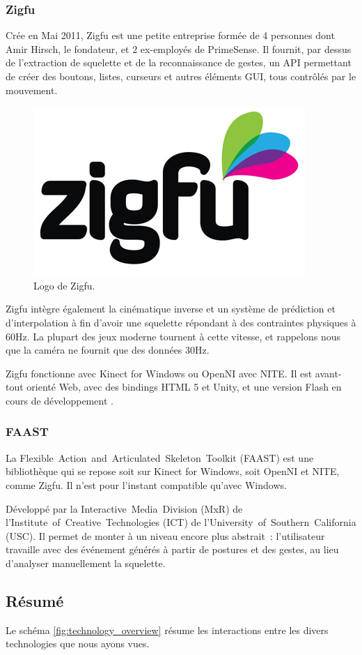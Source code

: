 \subsubsection{Zigfu}
Crée en Mai 2011, Zigfu est une petite entreprise formée de 4 personnes dont 
Amir Hirsch, le fondateur, et 2 ex-employés de PrimeSense. Il fournit, 
par dessus de l'extraction de squelette et de la reconnaissance
de gestes, un API permettant de créer des boutons, listes, curseurs et autres
éléments GUI, tous contrôlés par le mouvement.
\begin{figure}[h!]
\centering
\includegraphics[width=0.3\linewidth]{images/zigfu_logo}
\caption{Logo de Zigfu.}
\end{figure}
Zigfu intègre également la cinématique inverse et un système de 
prédiction et
d'interpolation à fin d'avoir une squelette répondant à des contraintes 
physiques à 60Hz\cite{zigfu_video}. La plupart des jeux moderne tournent à cette 
vitesse, et 
rappelons nous que la caméra ne fournit que des données 30Hz.

Zigfu fonctionne avec Kinect for Windows ou OpenNI avec NITE. Il est 
avant-tout orienté Web, avec des
bindings HTML 5 et Unity, et une version Flash en cours de développement
\cite{zigfu_review}.

\subsubsection{FAAST}
La Flexible~Action~and~Articulated~Skeleton~Toolkit (FAAST) est une 
bibliothèque qui se repose soit sur Kinect for Windows, soit OpenNI et NITE, 
comme Zigfu. Il n'est pour l'instant compatible qu'avec Windows.

Développé par la Interactive~Media~Division (MxR) de 
l'Institute~of~Creative~Technologies (ICT) de 
l'University~of~Southern~California (USC). Il permet de monter à un niveau 
encore plus abstrait~: l'utilisateur travaille avec des événement générés à
partir de postures et des gestes, au lieu d'analyser manuellement la 
squelette.


\subsection{Résumé}
Le schéma \ref{fig:technology_overview} résume les interactions entre les divers 
technologies que nous ayons vues.

